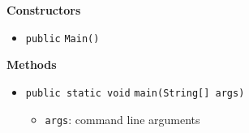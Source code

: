 \textbf{Constructors}
\begin{itemize}
\item \lstinline|public| \lstinline|Main|\lstinline|()|




\end{itemize}


\textbf{Methods}
\begin{itemize}
\item \lstinline|public static void| \lstinline|main|\lstinline|(String[] args)|

\begin{itemize}
\item \lstinline|args|: command line arguments
\end{itemize}



\end{itemize}


